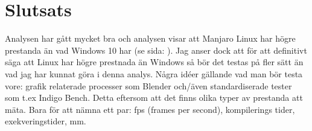 \documentclass[12pt, a4paper]{report}
\begin{document}
\section{Slutsats}\label{slutsats}

Analysen har gått mycket bra och analysen visar att Manjaro Linux har högre prestanda än vad Windows 10 har (se sida: \pageref{tests}). Jag anser dock att för att definitivt säga att Linux har högre prestnada än Windows så bör det testas på fler sätt än vad jag har kunnat göra i denna analys. Några idéer gällande vad man bör testa vore: grafik relaterade processer som Blender\cite{blender} och/även standardiserade tester som t.ex Indigo Bench\cite{indigo}. Detta eftersom att det finns olika typer av prestanda att mäta. Bara för att nämna ett par: fps (frames per second), kompilerings tider, exekveringstider, mm.


\printbibliography[type=online]

\printbibliography[type=misc, title={Bilagor}]
\end{document}
